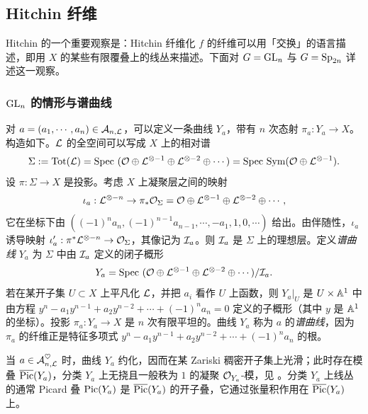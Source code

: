 \subsection{Hitchin 纤维} Hitchin 的一个重要观察是：Hitchin 纤维化 $f$ 的纤维可以用「交换」的语言描述，即用 $X$ 的某些有限覆叠上的线丛来描述。下面对 $G=\GL_{n}$ 与 $G=\Sp_{2n}$ 详述这一观察。

\subsubsection{$\GL_{n}$ 的情形与谱曲线}\label{sss:spectral curve} 对 $a=(a_{1},\cdots, a_{n})\in\calA_{n,\calL}$，可以定义一条曲线 $Y_{a}$，带有 $n$ 次态射 $\pi_{a}: Y_{a}\to X$。构造如下。$\calL$ 的全空间可以写成 $X$ 上的相对谱
\begin{equation*}
\Sigma:=\Tot(\calL)=\Spec(\calO\oplus\calL^{\otimes -1}\oplus\calL^{\otimes -2}\oplus\cdots)=\Spec\Sym(\calO\oplus\calL^{\otimes -1}).
\end{equation*}
设 $\pi: \Sigma\to X$ 是投影。考虑 $X$ 上凝聚层之间的映射
\begin{equation*}
\iota_{a}: \calL^{\otimes -n}\to \pi_{*}\calO_{\Sigma}=\calO\oplus\calL^{\otimes -1}\oplus\calL^{\otimes -2}\oplus\cdots,
\end{equation*}
它在坐标下由 $((-1)^{n}a_{n}, (-1)^{n-1}a_{n-1},\cdots, -a_{1},1,0,\cdots)$ 给出。由伴随性，$\iota_{a}$ 诱导映射 $\iota'_{a}: \pi^{*}\calL^{\otimes -n}\to \calO_{\Sigma}$，其像记为 $\calI_{a}$。则 $\calI_{a}$ 是 $\Sigma$ 上的理想层。定义{\em 谱曲线} $Y_{a}$ 为 $\Sigma$ 中由 $\calI_{a}$ 定义的闭子概形
\begin{equation*}
Y_{a}=\Spec(\calO\oplus\calL^{\otimes-1}\oplus\calL^{\otimes-2}\oplus\cdots)/\calI_{a}.
\end{equation*}
若在某开子集 $U\subset X$ 上平凡化 $\calL$，并把 $a_{i}$ 看作 $U$ 上函数，则 $Y_{a}|_{U}$ 是 $U\times\AA^{1}$ 中由方程 $y^{n}-a_{1}y^{n-1}+a_{2}y^{n-2}+\cdots +(-1)^{n}a_{n}=0$ 定义的子概形（其中 $y$ 是 $\AA^{1}$ 的坐标）。投影 $\pi_{a}: Y_{a}\to X$ 是 $n$ 次有限平坦的。曲线 $Y_{a}$ 称为 $a$ 的{\em 谱曲线}，因为 $\pi_{a}$ 的纤维正是特征多项式 $y^{n}-a_{1}y^{n-1}+a_{2}y^{n-2}+\cdots +(-1)^{n}a_{n}$ 的根。

当 $a\in\Ah_{n,\calL}$ 时，曲线 $Y_{a}$ 约化，因而在某 Zariski 稠密开子集上光滑；此时存在模叠 $\cPic(Y_{a})$，分类 $Y_{a}$ 上无挠且一般秩为 $1$ 的凝聚 $\calO_{Y_{a}}$-模，见 \cite{AK}。分类 $Y_{a}$ 上线丛的通常 Picard 叠 $\Pic(Y_{a})$ 是 $\cPic(Y_{a})$ 的开子叠，它通过张量积作用在 $\cPic(Y_{a})$ 上。

